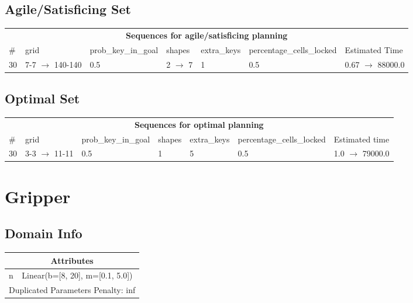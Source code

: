\documentclass{article}
\begin{document}
                         \subsection*{Agile/Satisficing Set}

                        \begin{center}
                        \begin{tabular}{l|l|l|l|l|l|l}
                        \multicolumn{7}{c}{\bf \large Sequences for agile/satisficing planning}\\
                        \# & grid & prob\_key\_in\_goal & shapes & extra\_keys & percentage\_cells\_locked & Estimated Time\\\midrule
                        30&7-7 $\rightarrow$ 140-140&0.5&2 $\rightarrow$ 7&1&0.5&0.67 $\rightarrow$ 88000.0
                        \end{tabular}
                        \end{center}
                    
                            \subsection*{Optimal Set}

                            \begin{center}
                            \begin{tabular}{l|l|l|l|l|l|l}
                            \multicolumn{7}{c}{\bf \large Sequences for optimal planning}\\
                            \# & grid & prob\_key\_in\_goal & shapes & extra\_keys & percentage\_cells\_locked & Estimated time\\\midrule
                            30&3-3 $\rightarrow$ 11-11&0.5&1&5&0.5&1.0 $\rightarrow$ 79000.0
                            \end{tabular}
                            \end{center}
                    \newpage \section{Gripper}
                    \subsection*{Domain Info}

                    \begin{center}
                    \begin{tabular}{p{}p{}}
                    \multicolumn{2}{c}{\bf \large Attributes}\\\midrule
                    n & Linear(b=[8, 20], m=[0.1, 5.0])
                    
                     \\\midrule
                    \multicolumn{2}{l}{Duplicated Parameters Penalty: inf}
                    \end{tabular}
                    \end{center}
                
\end{document}
